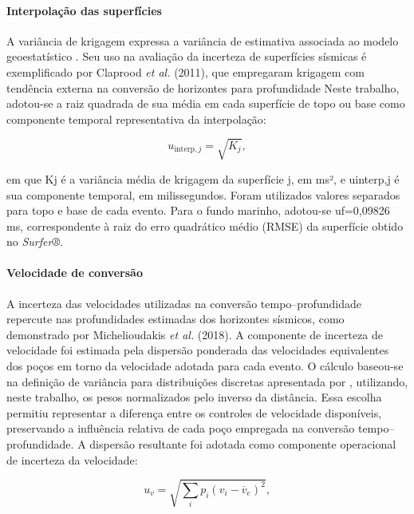 \paragraph{Interpolação das superfícies}

A variância de krigagem expressa a variância de estimativa associada ao modelo geoestatístico \cite{isaaks1989}. Seu uso na avaliação da incerteza de superfícies sísmicas é exemplificado por Claprood \textit{et al.} (2011), que empregaram krigagem com tendência externa na conversão de horizontes para profundidade Neste trabalho, adotou-se a raiz quadrada de sua média em cada superfície de topo ou base como componente temporal representativa da interpolação:

\begin{equation}
  u_{\mathrm{interp},j}=\sqrt{K_j},
  \label{eq:interpolacao}
\end{equation}

\noindent
em que Kj é a variância média de krigagem da superfície j, em ms², e uinterp,j é sua componente temporal, em milissegundos. Foram utilizados valores separados para topo e base de cada evento. Para o fundo marinho, adotou-se uf=0,09826 ms, correspondente à raiz do erro quadrático médio (RMSE) da superfície obtido no \textit{Surfer®}.

\paragraph{Velocidade de conversão}

A incerteza das velocidades utilizadas na conversão tempo--profundidade repercute nas profundidades estimadas dos horizontes sísmicos, como demonstrado por Michelioudakis \textit{et al. }(2018). A componente de incerteza de velocidade foi estimada pela dispersão ponderada das velocidades equivalentes dos poços em torno da velocidade adotada para cada evento. O cálculo baseou-se na definição de variância para distribuições discretas apresentada por , utilizando, neste trabalho, os pesos normalizados pelo inverso da distância. Essa escolha permitiu representar a diferença entre os controles de velocidade disponíveis, preservando a influência relativa de cada poço empregada na conversão tempo--profundidade. A dispersão resultante foi adotada como componente operacional de incerteza da velocidade:

\begin{equation}
  u_v=\sqrt{\sum_i p_i(v_i-\overline{v}_e)^2},
  \label{eq:dispersao-velocidade}
\end{equation}


